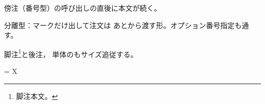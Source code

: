 \documentclass[pdflatex,sidenote_length=20zw]{jlreq}
\begin{document}
傍注（番号型）の呼び出しの直後に本文が続く。

分離型：マークだけ出し\sidenotemark て注文は 
あとから渡す形。オプション番号指定も通す。

脚注\footnote{脚注本文。}と後注，
単体のもサイズ追従する。

\theendnotes
\makeatletter
=\vbox{\reset@font\footnotesize
  \ifdim\jlreq@jareg=8.00003pt\relax
    \typeout{SIDENOTE-JAREG-OK: \the\jlreq@jareg}%
  \else
    \errmessage{SIDENOTE-JAREG-NG: \the\jlreq@jareg\space (expected 8.00003pt)}%
  \fi
  X}%
\makeatother
\end{document}

